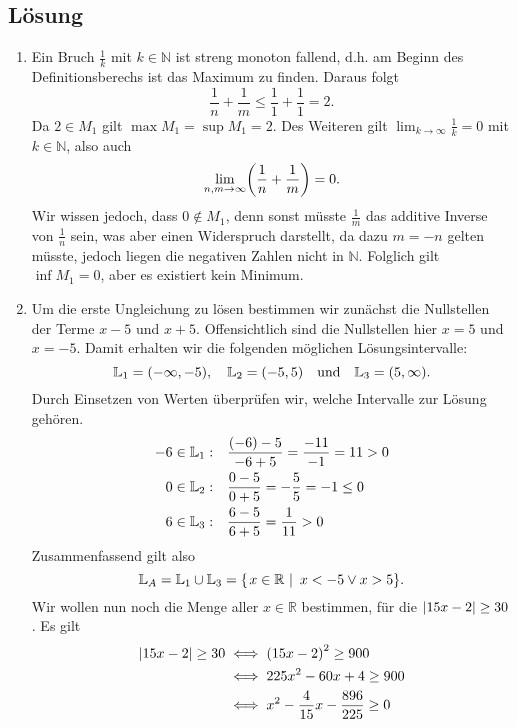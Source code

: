 \documentclass[german,12pt]{homework}
\newcommand{\NN}{\mathbb{N}}
\newcommand{\RR}{\mathbb{R}}
\newcommand{\LL}{\mathbb{L}}
\DeclarePairedDelimiter{\absolute}{\lvert}{\rvert}
\DeclarePairedDelimiter{\enbrace}{(}{)}
\DeclarePairedDelimiter{\penbrace}{\{}{\}}
\begin{document}
    \subsection*{Lösung}
    \begin{enumerate}
        \item Ein Bruch \(\frac{1}{k}\) mit \(k \in \NN\) ist streng monoton fallend, d.h. am Beginn des Definitionsberechs ist das Maximum zu finden. Daraus folgt
        \[\frac{1}{n} + \frac{1}{m} \le \frac{1}{1} + \frac{1}{1} = 2.\]
        Da \(2 \in M_1\) gilt \(\max{M_1} = \sup{M_1} = 2\). Des Weiteren gilt \(\lim_{k \to \infty}\frac{1}{k} = 0\) mit \(k \in \NN\), also auch
        \[\lim_{n, m \to \infty}\enbrace*{\frac{1}{n} + \frac{1}{m}} = 0.\]
        Wir wissen jedoch, dass \(0 \not\in M_1\), denn sonst müsste \(\frac{1}{m}\) das additive Inverse von \(\frac{1}{n}\) sein, was aber einen Widerspruch darstellt, da dazu \(m = -n\) gelten müsste, jedoch liegen die negativen Zahlen nicht in \(\NN\). Folglich gilt \(\inf{M_1} = 0\), aber es existiert kein Minimum.
        \item Um die erste Ungleichung zu lösen bestimmen wir zunächst die Nullstellen der Terme \(x - 5\) und \(x + 5\). Offensichtlich sind die Nullstellen hier \(x = 5\) und \(x = -5\). Damit erhalten wir die folgenden möglichen Lösungsintervalle:
        \[\LL_1 = \enbrace*{-\infty, -5}, \quad \LL_2 = \enbrace*{-5, 5} \quad \text{und} \quad \LL_3 = \enbrace*{5, \infty}.\]
        Durch Einsetzen von Werten überprüfen wir, welche Intervalle zur Lösung gehören.
        \begin{align*}
            -6 \in \LL_1: \quad &\frac{\enbrace*{-6} - 5}{-6 + 5} = \frac{-11}{-1} = 11 > 0\\
            0 \in \LL_2: \quad &\frac{0 - 5}{0 + 5} = -\frac{5}{5} = -1 \le 0\\
            6 \in \LL_3: \quad &\frac{6 - 5}{6 + 5} = \frac{1}{11} > 0
        \end{align*}
        Zusammenfassend gilt also
        \[\LL_A = \LL_1 \cup \LL_3 = \penbrace*{\left.x \in \RR\ \right|\ x < -5 \lor x > 5}.\]
        Wir wollen nun noch die Menge aller \(x \in \RR\) bestimmen, für die \(\absolute*{15x - 2} \ge 30\). Es gilt
        \begin{align*}
            \absolute*{15x - 2} \ge 30 &\iff \enbrace*{15x - 2}^2 \ge 900\\
            &\iff 225x^2 - 60x + 4 \ge 900\\
            &\iff x^2 - \frac{4}{15}x - \frac{896}{225} \ge 0
        \end{align*}

\end{enumerate}
\end{document}
